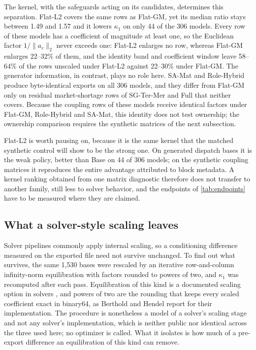 \documentclass[smallextended,envcountsect,envcountsame]{svjour3}
\begin{document}
The kernel, with the safeguards acting on its candidates, determines this separation. Flat-L2
covers the same rows as Flat-GM, yet its median
ratio stays between 1.49 and 1.57 and it lowers $\kappa_1$ on only 44 of the 306 models. Every
row of these models has a coefficient of magnitude at least one, so the Euclidean factor
$1/\|a_r\|_2$ never exceeds one: Flat-L2 enlarges no row, whereas Flat-GM enlarges 22--32\% of
them, and the identity band and coefficient window leave 58--64\% of the rows unscaled under
Flat-L2 against 22--30\% under Flat-GM. The generator information, in contrast, plays no role
here. SA-Mat and Role-Hybrid produce byte-identical exports on all 306 models, and they differ
from Flat-GM only on residual market-shortage rows of SG-Ter-Mer and Full that neither covers.
Because the coupling rows of these models receive identical factors under Flat-GM, Role-Hybrid and
SA-Mat, this identity does not test ownership; the ownership comparison requires the synthetic
matrices of the next subsection.

Flat-L2 is worth pausing on, because it is the same kernel that the matched synthetic control
will show to be the strong one. On generated dispatch bases it is the weak policy, better than
Base on 44 of 306 models; on the synthetic coupling matrices it reproduces the entire advantage
attributed to block metadata. A kernel ranking obtained from one matrix diagnostic therefore
does not transfer to another family, still less to solver behavior, and the endpoints of
\cref{tab:endpoints} have to be measured where they are claimed.

\subsection{What a solver-style scaling leaves}
\label{subsec:results-bridge}
Solver pipelines commonly apply internal scaling, so a conditioning difference measured on the
exported file need not survive unchanged. To find out what survives, the same 1,530 bases were
rescaled by an iterative row-and-column infinity-norm equilibration with factors rounded to
powers of two, and $\kappa_1$ was recomputed after each pass. Equilibration of this kind is a
documented scaling option in solvers \cite{gurobiScaling,berthold2021scaling}, and powers of two
are the rounding that keeps every scaled coefficient exact in binary64, as Berthold and Hendel
\cite{berthold2021scaling} report for their implementation. The procedure is nonetheless a
model of a solver's scaling stage and not any solver's implementation, which is neither public
nor identical across the three used here; no optimizer is called. What it isolates is how much
of a pre-export difference an equilibration of this kind can remove.
\end{document}
